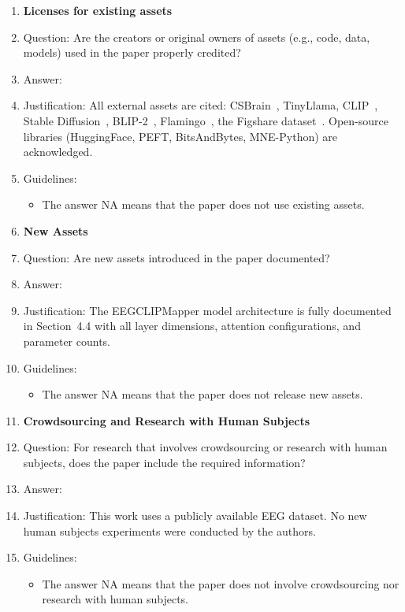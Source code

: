 \documentclass{article}
\begin{document}
\begin{enumerate}
\item {\bf Licenses for existing assets}
    \item[] Question: Are the creators or original owners of assets (e.g., code, data, models) used in the paper properly credited?
    \item[] Answer: \answerYes{}
    \item[] Justification: All external assets are cited: CSBrain~\citep{zhu2024csbrain}, TinyLlama, CLIP~\citep{radford2021clip}, Stable Diffusion~\citep{rombach2022ldm}, BLIP-2~\citep{li2023blip2}, Flamingo~\citep{alayrac2022flamingo}, the Figshare dataset~\citep{figshare_eeg}. Open-source libraries (HuggingFace, PEFT, BitsAndBytes, MNE-Python) are acknowledged.
    \item[] Guidelines:
    \begin{itemize}
        \item The answer NA means that the paper does not use existing assets.
    \end{itemize}

\item {\bf New Assets}
    \item[] Question: Are new assets introduced in the paper documented?
    \item[] Answer: \answerYes{}
    \item[] Justification: The EEGCLIPMapper model architecture is fully documented in Section~4.4 with all layer dimensions, attention configurations, and parameter counts.
    \item[] Guidelines:
    \begin{itemize}
        \item The answer NA means that the paper does not release new assets.
    \end{itemize}

\item {\bf Crowdsourcing and Research with Human Subjects}
    \item[] Question: For research that involves crowdsourcing or research with human subjects, does the paper include the required information?
    \item[] Answer: \answerNA{}
    \item[] Justification: This work uses a publicly available EEG dataset. No new human subjects experiments were conducted by the authors.
    \item[] Guidelines:
    \begin{itemize}
        \item The answer NA means that the paper does not involve crowdsourcing nor research with human subjects.
    \end{itemize}


\end{enumerate}
\end{document}
